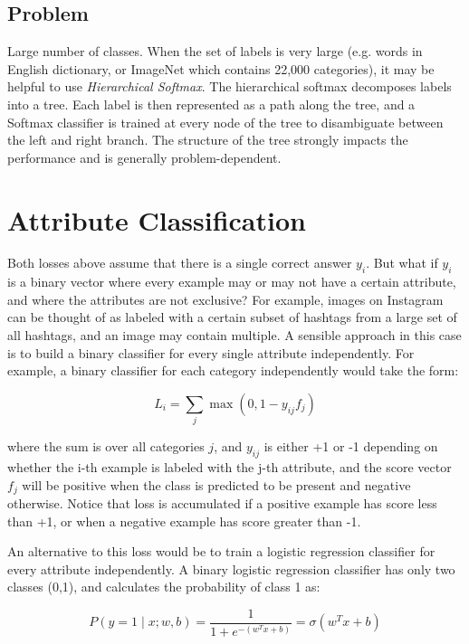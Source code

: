 \subsection*{Problem}

Large number of classes. When the set of labels is very large (e.g. words in English dictionary, or ImageNet which contains 22,000 categories), it may be helpful to use \textit{Hierarchical Softmax}. The hierarchical softmax decomposes labels into a tree. Each label is then represented as a path along the tree, and a Softmax classifier is trained at every node of the tree to disambiguate between the left and right branch. The structure of the tree strongly impacts the performance and is generally problem-dependent.

\section*{Attribute Classification}
Both losses above assume that there is a single correct answer $y_i$. But what if $y_i$ is a binary vector where every example may or may not have a certain attribute, and where the attributes are not exclusive? For example, images on Instagram can be thought of as labeled with a certain subset of hashtags from a large set of all hashtags, and an image may contain multiple. A sensible approach in this case is to build a binary classifier for every single attribute independently. For example, a binary classifier for each category independently would take the form:

\begin{equation}
L_i = \sum_j \max(0, 1 - y_{ij} f_j)
\end{equation}

where the sum is over all categories $j$, and $y_{ij}$ is either +1 or -1 depending on whether the i-th example is labeled with the j-th attribute, and the score vector $f_j$ will be positive when the class is predicted to be present and negative otherwise. Notice that loss is accumulated if a positive example has score less than +1, or when a negative example has score greater than -1.

An alternative to this loss would be to train a logistic regression classifier for every attribute independently. A binary logistic regression classifier has only two classes (0,1), and calculates the probability of class 1 as:

\begin{equation}
P(y = 1 \mid x; w, b) = \frac{1}{1 + e^{-(w^Tx +b)}} = \sigma (w^Tx + b)
\end{equation}

